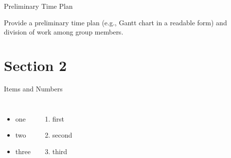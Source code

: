 \documentclass[aspectratio=169]{beamer}
\begin{document}

\begin{frame}[c]{Preliminary Time Plan}
\begin{theorem}
Provide a preliminary time plan (e.g., Gantt
chart in a readable form) and division of work among group members.
\end{theorem}
\end{frame}


\section{Section 2}

\begin{frame}[t]{Items and Numbers}
\begin{columns}
            \begin{itemize}
            \item one
            \item two
            \item three
            \end{itemize}
            \begin{enumerate}
            \item first
            \item second
            \item third
            \end{enumerate}
\end{columns}
\end{frame}


\begin{frame}[t,plain]
\end{frame}
\end{document}
